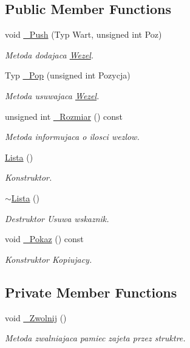 \subsection*{Public Member Functions}
\begin{DoxyCompactItemize}
\item 
void \hyperlink{class_lista_a5969ea939160694d8eea3cff3ac34cb8}{\-\_\-\-Push} (Typ Wart, unsigned int Poz)
\begin{DoxyCompactList}\small\item\em Metoda dodajaca \hyperlink{struct_lista_1_1_wezel}{Wezel}. \end{DoxyCompactList}\item 
Typ \hyperlink{class_lista_a515f4dd7a4ffdfb2fdc12a5fa28e97a4}{\-\_\-\-Pop} (unsigned int Pozycja)
\begin{DoxyCompactList}\small\item\em Metoda usuwajaca \hyperlink{struct_lista_1_1_wezel}{Wezel}. \end{DoxyCompactList}\item 
unsigned int \hyperlink{class_lista_a4fb94c2a9d576a4a32acd1e63f339d38}{\-\_\-\-Rozmiar} () const 
\begin{DoxyCompactList}\small\item\em Metoda informujaca o ilosci wezlow. \end{DoxyCompactList}\item 
\hyperlink{class_lista_a674e0e60c11e301bcfb39ca4a9102f9a}{Lista} ()
\begin{DoxyCompactList}\small\item\em Konstruktor. \end{DoxyCompactList}\item 
\hyperlink{class_lista_acfd996dad8df54ffaa389fdcbe04f643}{$\sim$\-Lista} ()
\begin{DoxyCompactList}\small\item\em Destruktor Usuwa wskaznik. \end{DoxyCompactList}\item 
void \hyperlink{class_lista_abae4fe58b5a4225b0df8d98caa65db75}{\-\_\-\-Pokaz} () const 
\begin{DoxyCompactList}\small\item\em Konstruktor Kopiujacy. \end{DoxyCompactList}\end{DoxyCompactItemize}
\subsection*{Private Member Functions}
\begin{DoxyCompactItemize}
\item 
void \hyperlink{class_lista_a3ff3e2f58bd3b1d1b11f9ad68948a321}{\-\_\-\-Zwolnij} ()
\begin{DoxyCompactList}\small\item\em Metoda zwalniajaca pamiec zajeta przez struktre. \end{DoxyCompactList}\end{DoxyCompactItemize}
